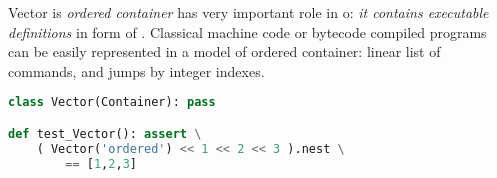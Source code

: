 \clearpage{}

Vector is \emph{ordered container} has very important role in o\F: \emph{it
contains executable definitions} in form of .
Classical machine code or bytecode compiled programs can be easily represented
in a model of ordered container: linear list of commands, and jumps by integer
indexes.
\begin{lstlisting}[language=Python]
class Vector(Container): pass

def test_Vector(): assert \
	( Vector('ordered') << 1 << 2 << 3 ).nest \
		== [1,2,3]
\end{lstlisting}
